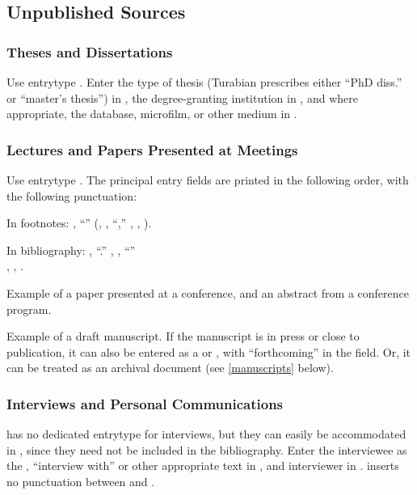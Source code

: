 \documentclass{ltxdockit}[2010/02/12]
\begin{document}
\subsection{Unpublished Sources}

\subsubsection{Theses and Dissertations}
Use entrytype . Enter the type of thesis (Turabian prescribes either ``PhD diss.'' or ``master's thesis'') in , the degree-granting institution in ,\autocites[][]{mylott2002the-roots-of-ce,gliboff1997evolution-revol} and where appropriate, the database, microfilm, or other medium in .\autocites[][]{schloegel2006intimate-biolog}

\subsubsection{Lectures and Papers Presented at Meetings}
Use entrytype . The principal entry fields are printed in the following order, with the following punctuation:

In footnotes:
, ``'' (, , ``,'' , , ).

In bibliography:
, ``.'' , , ``''\\ , , .

Example of a paper presented at a conference,\autocites[][]{2454} and an abstract from a  conference program.\autocites[][]{1977}

Example of a draft manuscript.\autocites[][]{2469}
If the manuscript is in press or close to publication, it can also be entered as a  or , with ``forthcoming'' in the  field. Or, it can be treated as an archival document (see \ref{manuscripts} below).

\subsubsection{Interviews and Personal Communications}\label{interviews}
 has no dedicated entrytype for interviews, but they can easily be accommodated in , since they need not be included in the bibliography. Enter the interviewee as the , ``interview with'' or other appropriate text in , and interviewer in .\autocites[][]{dobzhansky196215}  inserts no punctuation between  and . 
\end{document}
